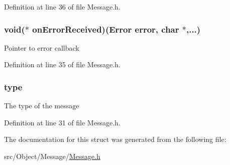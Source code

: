 Definition at line 36 of file Message.h.

\hypertarget{struct_message_a3c8af4f580f3041d046b7581f89a9695}{
\subsubsection[{onErrorReceived}]{\setlength{\rightskip}{0pt plus 5cm}void($\ast$ {\bf onErrorReceived})({\bf Error} error, char $\ast$,...)}}
\label{struct_message_a3c8af4f580f3041d046b7581f89a9695}
Pointer to error callback 

Definition at line 35 of file Message.h.

\hypertarget{struct_message_a8a2053c7fb1adf60da2f26c06059539e}{
\subsubsection[{type}]{ {\bf type}}}
\label{struct_message_a8a2053c7fb1adf60da2f26c06059539e}
The type of the message 

Definition at line 31 of file Message.h.



The documentation for this struct was generated from the following file:\begin{DoxyCompactItemize}
\item 
src/Object/Message/\hyperlink{_message_8h}{Message.h}\end{DoxyCompactItemize}
